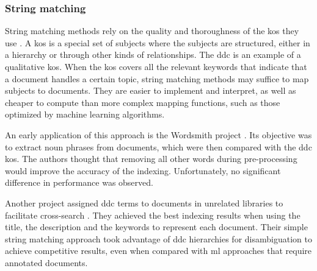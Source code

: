 \subsubsection{String matching}

String matching methods rely on the quality and thoroughness of the \acrfull{kos} they use \cite{golub2019automatic}. A \acrshort{kos} is a special set of subjects where the subjects are structured, either in a hierarchy or through other kinds of relationships. The \acrlong{ddc} is an example of a  qualitative \acrshort{kos}. When the \acrshort{kos} covers all the relevant keywords that indicate that a document handles a certain topic, string matching methods may suffice to map subjects to documents. They are easier to implement and interpret, as well as cheaper to compute than more complex mapping functions, such as those optimized by machine learning algorithms.

An early application of this approach is the Wordsmith project \cite{godby2001wordsmith}. Its objective was to extract noun phrases from documents, which were then compared with the \acrfull{ddc} \acrshort{kos}. The authors thought that removing all other words during pre-processing would improve the accuracy of the indexing. Unfortunately, no significant difference in performance was observed.

Another project assigned \acrshort{ddc} terms to documents in unrelated libraries to facilitate cross-search \cite{khoo2015augmenting}. They achieved the best indexing results when using the title, the description and the keywords to represent each document. Their simple string matching approach took advantage of \acrshort{ddc} hierarchies for disambiguation to achieve competitive results, even when compared with \acrshort{ml} approaches that require annotated documents.